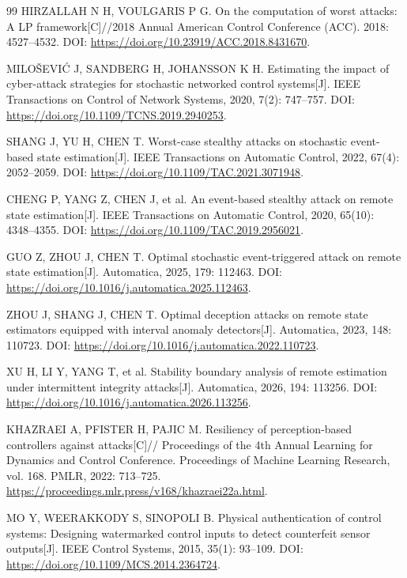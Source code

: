 \begin{thebibliography}{99}
HIRZALLAH N H, VOULGARIS P G.
On the computation of worst attacks: A LP framework[C]//2018 Annual American Control Conference (ACC).
2018: 4527--4532.
DOI: \url{https://doi.org/10.23919/ACC.2018.8431670}.

MILO\v SEVI\'C J, SANDBERG H, JOHANSSON K H.
Estimating the impact of cyber-attack strategies for stochastic networked control systems[J].
IEEE Transactions on Control of Network Systems, 2020, 7(2): 747--757.
DOI: \url{https://doi.org/10.1109/TCNS.2019.2940253}.

SHANG J, YU H, CHEN T.
Worst-case stealthy attacks on stochastic event-based state estimation[J].
IEEE Transactions on Automatic Control, 2022, 67(4): 2052--2059.
DOI: \url{https://doi.org/10.1109/TAC.2021.3071948}.

CHENG P, YANG Z, CHEN J, et al.
An event-based stealthy attack on remote state estimation[J].
IEEE Transactions on Automatic Control, 2020, 65(10): 4348--4355.
DOI: \url{https://doi.org/10.1109/TAC.2019.2956021}.

GUO Z, ZHOU J, CHEN T.
Optimal stochastic event-triggered attack on remote state estimation[J].
Automatica, 2025, 179: 112463.
DOI: \url{https://doi.org/10.1016/j.automatica.2025.112463}.

ZHOU J, SHANG J, CHEN T.
Optimal deception attacks on remote state estimators equipped with interval anomaly detectors[J].
Automatica, 2023, 148: 110723.
DOI: \url{https://doi.org/10.1016/j.automatica.2022.110723}.

XU H, LI Y, YANG T, et al.
Stability boundary analysis of remote estimation under intermittent integrity attacks[J].
Automatica, 2026, 194: 113256.
DOI: \url{https://doi.org/10.1016/j.automatica.2026.113256}.

KHAZRAEI A, PFISTER H, PAJIC M.
Resiliency of perception-based controllers against attacks[C]//
Proceedings of the 4th Annual Learning for Dynamics and Control Conference.
Proceedings of Machine Learning Research, vol. 168.
PMLR, 2022: 713--725.
\url{https://proceedings.mlr.press/v168/khazraei22a.html}.

MO Y, WEERAKKODY S, SINOPOLI B.
Physical authentication of control systems: Designing watermarked control inputs to detect counterfeit sensor outputs[J].
IEEE Control Systems, 2015, 35(1): 93--109.
DOI: \url{https://doi.org/10.1109/MCS.2014.2364724}.


\end{thebibliography}
